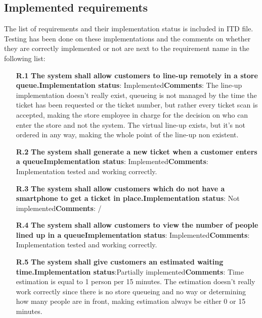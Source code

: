 \subsection{Implemented requirements}
\hspace{\parindent} The list of requirements and their implementation status is included in ITD file. Testing has been done on these implementations and the comments on whether they are correctly implemented or not are next to the requirement name in the following list:

\begin{itemize}
\item[\textbf{R.1}]\textbf{ The system shall allow customers to line-up remotely in a store queue.}\newline \textbf{Implementation status}: Implemented\newline \textbf{Comments}: The line-up implementation doesn't really exist, queueing is not managed by the time the ticket has been requested or the ticket number, but rather every ticket scan is accepted, making the store employee in charge for the decision on who can enter the store and not the system. The virtual line-up exists, but it's not ordered in any way, making the whole point of the line-up non existent.
\item[\textbf{R.2}] \textbf{The system shall generate a new ticket when a customer enters a queue}\newline \textbf{Implementation status}: Implemented\newline \textbf{Comments}: Implementation tested and working correctly.
\item[\textbf{R.3}]\textbf{The system shall allow customers which do not have a smartphone to get a ticket in place.}\newline \textbf{Implementation status}: Not implemented\newline \textbf{Comments}: /
\item[\textbf{R.4}]\textbf{The system shall allow customers to view the number of people lined up in a queue}\newline \textbf{Implementation status}: Implemented\newline \textbf{Comments}: Implementation tested and working correctly.
\item[\textbf{R.5}]\textbf{The system shall give customers an estimated waiting time.}\newline \textbf{Implementation status}:Partially implemented\newline \textbf{Comments}: Time estimation is equal to 1 person per 15 minutes. The estimation doesn't really work correctly since there is no store queueing and no way or determining how many people are in front, making estimation always be either 0 or 15 minutes.

\end{itemize}
